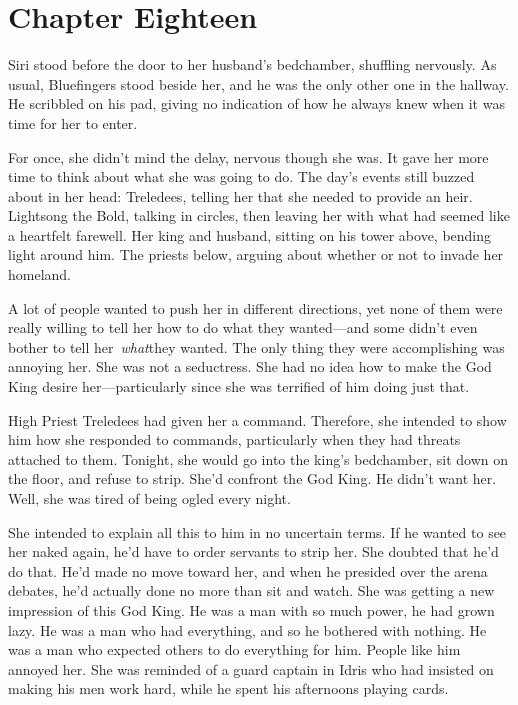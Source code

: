 \section{Chapter Eighteen}

Siri stood before the door to her husband’s bedchamber, shuffling nervously. As usual, Bluefingers stood beside her, and he was the only other one in the hallway. He scribbled on his pad, giving no indication of how he always knew when it was time for her to enter.

For once, she didn’t mind the delay, nervous though she was. It gave her more time to think about what she was going to do. The day’s events still buzzed about in her head: Treledees, telling her that she needed to provide an heir. Lightsong the Bold, talking in circles, then leaving her with what had seemed like a heartfelt farewell. Her king and husband, sitting on his tower above, bending light around him. The priests below, arguing about whether or not to invade her homeland.

A lot of people wanted to push her in different directions, yet none of them were really willing to tell her how to do what they wanted—and some didn’t even bother to tell her~\textit{what}they wanted. The only thing they were accomplishing was annoying her. She was not a seductress. She had no idea how to make the God King desire her—particularly since she was terrified of him doing just that.

High Priest Treledees had given her a command. Therefore, she intended to show him how she responded to commands, particularly when they had threats attached to them. Tonight, she would go into the king’s bedchamber, sit down on the floor, and refuse to strip. She’d confront the God King. He didn’t want her. Well, she was tired of being ogled every night.

She intended to explain all this to him in no uncertain terms. If he wanted to see her naked again, he’d have to order servants to strip her. She doubted that he’d do that. He’d made no move toward her, and when he presided over the arena debates, he’d actually done no more than sit and watch. She was getting a new impression of this God King. He was a man with so much power, he had grown lazy. He was a man who had everything, and so he bothered with nothing. He was a man who expected others to do everything for him. People like him annoyed her. She was reminded of a guard captain in Idris who had insisted on making his men work hard, while he spent his afternoons playing cards.

